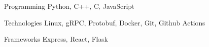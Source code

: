 

\begin{cvskills}

  \cvskill
  {Programming} %
  {Python, C++, C, JavaScript} %

  \cvskill
  {Technologies} %
  {Linux, gRPC, Protobuf, Docker, Git, Github Actions} %

  \cvskill
  {Frameworks} %
  {Express, React, Flask} %

\end{cvskills}
